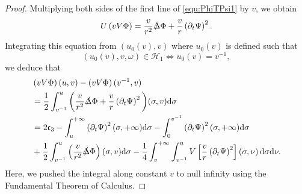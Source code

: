 \documentclass[a4paper,reqno]{amsart}
\theoremstyle{definition}
\numberwithin{equation}{section}
\def \d {{\rm{d}}}
\def \pt{\partial_{t}}
\def\Deltas{\slashed{\Delta}}
\begin{document}
\begin{proof}
Multiplying both sides of the first line of \eqref{equ:PhiTPsi1} by $v$, we obtain 
\begin{equation*}
U\left(vV\Phi\right)=\frac{v}{r^{2}}\Deltas \Phi+\frac{v}{r}\left(\pt \Psi\right)^{2}.
\end{equation*}
Integrating this equation from $(u_{0}(v),v)$ where $u_{0}(v)$ is defined such that
\begin{equation}
\label{def:u_0(v)}
(u_{{0}}(v),v,\omega)\in \mathcal{H}_1\Longleftrightarrow u_{0}(v)=v^{-1},
\end{equation}
we deduce that
\begin{equation}
\label{eq:RegionII:VPhi:integralalongU}
\begin{aligned}
&\left(vV\Phi\right)(u,v)-\left(vV\Phi\right)(v^{-1},v)\\
&=\frac{1}{2}\int_{v^{-1}}^u \bigg(\frac{v}{r^{2}}\Deltas \Phi+\frac{v}{r}\left(\pt \Psi\right)^{2}\bigg)(\sigma, v)
\d \sigma\\
&=2\mathfrak{c}_{3}
-\int_{u}^{+\infty}\left(\pt \Psi\right)^{2}(\sigma,+\infty)\d \sigma
-\int_{0}^{v^{-1}}\left(\pt \Psi\right)^{2}(\sigma,+\infty)\d \sigma\\
&+\frac{1}{2}\int_{v^{-1}}^{u}\left(\frac{v}{r^{2}}\Deltas\Phi\right)(\sigma,v)\d \sigma
-\frac{1}{4}\int_{v}^{+\infty}\int_{v^{-1}}^{u}
V\left[\frac{v}{r}\left(\pt \Psi\right)^{2}\right]\left(\sigma,\nu\right)\d \sigma \d \nu.
\end{aligned}
\end{equation}
Here, we pushed the integral along constant $v$ to null infinity using the Fundamental Theorem of Calculus.


\end{proof}
\end{document}
